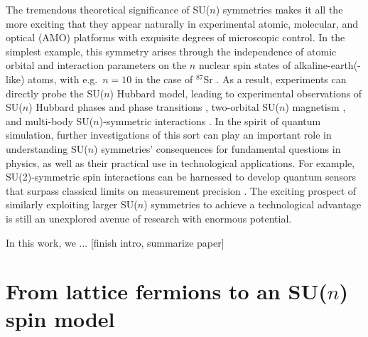 \documentclass[nofootinbib,twocolumn]{revtex4-2}
\newcommand{\1}{\mathds{1}}
\newcommand{\red}[1]{{\color{red} #1}}
\begin{document}
The tremendous theoretical significance of SU($n$) symmetries makes it all the more exciting that they appear naturally in experimental atomic, molecular, and optical (AMO) platforms \cite{gorshkov2010twoorbital, beverland2016realizing, cazalilla2014ultracold, taie2012su, hofrichter2016direct, cappellini2014direct, scazza2014observation, zhang2014spectroscopic, goban2018emergence, perlin2019effective} with exquisite degrees of microscopic control.
In the simplest example, this symmetry arises through the independence of atomic orbital and interaction parameters on the $n$ nuclear spin states of alkaline-earth(-like) atoms, with e.g.~$n=10$ in the case of ${}^{87}$Sr \cite{cazalilla2014ultracold}.
As a result, experiments can directly probe the SU($n$) Hubbard model, leading to experimental observations of SU($n$) Hubbard phases and phase transitions \cite{taie2012su, hofrichter2016direct}, two-orbital SU($n$) magnetism \cite{cappellini2014direct, scazza2014observation, zhang2014spectroscopic}, and multi-body SU($n$)-symmetric interactions \cite{goban2018emergence, perlin2019effective}.
In the spirit of quantum simulation, further investigations of this sort can play an important role in understanding SU($n$) symmetries' consequences for fundamental questions in physics, as well as their practical use in technological applications.
For example, SU(2)-symmetric spin interactions can be harnessed to develop quantum sensors that surpass classical limits on measurement precision \cite{he2019engineering, perlin2020spin}.
The exciting prospect of similarly exploiting larger SU($n$) symmetries to achieve a technological advantage is still an unexplored avenue of research with enormous potential.

In this work, we ... \red{[finish intro, summarize paper]}

\section{From lattice fermions to an SU($n$) spin model}
\label{sec:spin_model}
\end{document}
